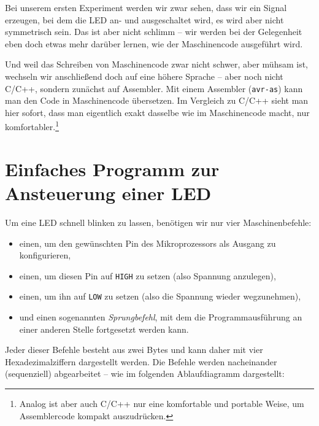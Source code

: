 \documentclass[a4paper,12pt]{article}
\begin{document}
Bei unserem ersten Experiment werden wir zwar sehen, dass wir ein Signal
erzeugen, bei dem die LED an- und ausgeschaltet wird, es wird aber nicht
symmetrisch sein. Das ist aber nicht schlimm – wir werden bei der Gelegenheit
eben doch etwas mehr darüber lernen, wie der Maschinencode ausgeführt wird.

Und weil das Schreiben von Maschinencode zwar nicht schwer, aber mühsam ist,
wechseln wir anschließend doch auf eine höhere Sprache – aber noch nicht C/C++,
sondern zunächst auf Assembler. Mit einem Assembler (\texttt{avr-as}) kann man
den Code in Maschinencode übersetzen. Im Vergleich zu C/C++ sieht man hier
sofort, dass man eigentlich exakt dasselbe wie im Maschinencode macht, nur
komfortabler.\footnote{Analog ist aber auch C/C++ nur eine komfortable und
portable Weise, um Assemblercode kompakt auszudrücken.}

\newpage
\section{Einfaches Programm zur Ansteuerung einer LED}

Um eine LED schnell blinken zu lassen, benötigen wir nur vier Maschinenbefehle: 

\begin{itemize}
    \item
	einen, um den gewünschten Pin des Mikroprozessors als Ausgang zu
	konfigurieren,
    \item
	einen, um diesen Pin auf \texttt{HIGH} zu setzen (also Spannung
	anzulegen),
    \item
	einen, um ihn auf \texttt{LOW} zu setzen (also die Spannung wieder
	wegzunehmen),
    \item
	und einen sogenannten \emph{Sprungbefehl}, mit dem die
	Programmausführung an einer anderen Stelle fortgesetzt werden kann.
\end{itemize}

\noindent
Jeder dieser Befehle besteht aus zwei Bytes und kann daher mit vier
Hexadezimalziffern dargestellt werden. Die Befehle werden nacheinander
(sequenziell) abgearbeitet – wie im folgenden Ablaufdiagramm dargestellt:
\end{document}

